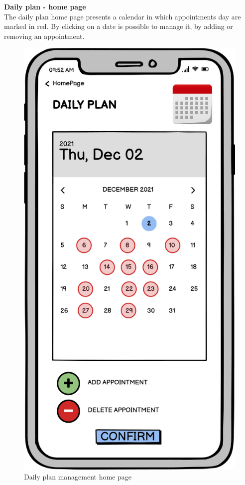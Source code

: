 \newpage
\textbf{Daily plan - home page} \\
The daily plan home page presents a calendar in which appointments day are marked in red.
By clicking on a date is possible to manage it, by adding or removing an appointment.
\begin{figure}[H]
    \centering
    \includegraphics[scale=0.40]{Images/dailyplan.png}
    \caption{Daily plan management home page}
\end{figure}



